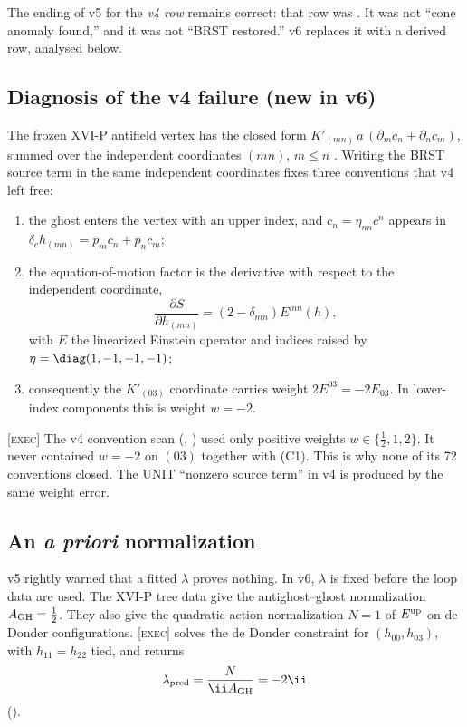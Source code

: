 The ending of v5 for the \emph{v4 row} remains correct: that row
was \UNVALIDATED.
It was not ``cone anomaly found,'' and it was not ``BRST restored.''
v6 replaces it with a derived row, analysed below.

\subsection{Diagnosis of the v4 failure (new in v6)}
\label{sec:STdiag}

The frozen XVI-P antifield vertex has the closed form
\(K'_{(mn)}\,a\,(\partial_mc_n+\partial_nc_m)\), summed over the
independent coordinates \((mn)\), \(m\le n\) \cite{CheungP}.
Writing the BRST source term in the same independent coordinates
fixes three conventions that v4 left free:
\begin{enumerate}[label=\textup{(C\arabic*)}]
\item the ghost enters the vertex with an upper index, and
\(c_n=\eta_{nn}c^n\) appears in
\(\delta_ch_{(mn)}=p_mc_n+p_nc_m\);
\item the equation-of-motion factor is the derivative with respect
to the independent coordinate,
\[
\frac{\partial S}{\partial h_{(mn)}}=(2-\delta_{mn})E^{mn}(h),
\]
with \(E\) the linearized Einstein operator and indices raised by
\(\eta=\diag(1,-1,-1,-1)\);
\item consequently the \(K'_{(03)}\) coordinate carries weight
\(2E^{03}=-2E_{03}\).
In lower-index components this is weight \(w=-2\).
\end{enumerate}
\textsc{[exec]} The v4 convention scan (,
) used only
positive weights \(w\in\{\tfrac12,1,2\}\).
It never contained \(w=-2\) on \((03)\) together with (C1).
This is why none of its 72 conventions closed.
The UNIT ``nonzero source term'' in v4 is produced by the same
weight error.

\subsection{An \emph{a priori} normalization}

v5 rightly warned that a fitted \(\lambda\) proves nothing.
In v6, \(\lambda\) is fixed before the loop data are used.
The XVI-P tree data give the antighost--ghost normalization
\(A_{\rm GH}=\tfrac12\).
They also give the quadratic-action normalization \(N=1\) of
\(E^{\rm up}\) on de Donder configurations.
\textsc{[exec]}  solves the de Donder
constraint for \((h_{00},h_{03})\), with \(h_{11}=h_{22}\) tied, and
returns
\[
\lambda_{\rm pred}=\frac{N}{\ii A_{\rm GH}}=-2\ii
\]
().

